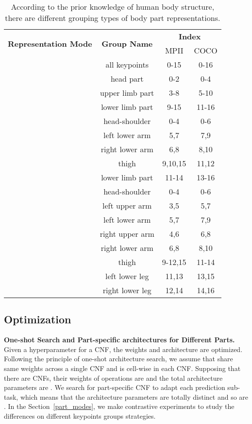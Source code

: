 \documentclass[journal]{IEEEtran}
\begin{document}
\begin{table}[h]
	\centering
	\caption{According to the prior knowledge of human body structure, there are different grouping types of body part representations.}
	\label{group}
	\renewcommand{\arraystretch}{1.1}
	\begin{tabular}{cccc}
		\toprule
		\multirow{2}{*}{\textbf{Representation Mode}}& \multirow{2}{*}{\textbf{Group Name}}&\multicolumn{2}{c}{\textbf{Index}}\\
	
		&&MPII&COCO\\
		\hline
		&all keypoints&0-15&0-16\\
		\hline
		
		\multirow{3}{*}{}& head part& 0-2  & 0-4\\
		
		& upper limb part&3-8 &5-10\\
		& lower limb part&9-15 &11-16\\
		\hline
		\multirow{5}{*}{}& head-shoulder& 0-4&0-6\\
		&left lower arm&5,7&7,9\\
		&right lower arm &6,8&8,10\\
		&thigh&9,10,15&11,12\\
		& lower limb part&11-14 &13-16\\
		\hline
		
		\multirow{8}{*}{}&head-shoulder&0-4&0-6\\
		&left upper arm&3,5&5,7\\
		&left lower arm&5,7&7,9\\
		&right upper arm&4,6&6,8\\
		
		&right lower arm &6,8&8,10\\
		&thigh&9-12,15&11-14\\
		&left lower leg &11,13&13,15\\
		&right lower leg&12,14&14,16\\
		\bottomrule
		
	\end{tabular}
	
	
\end{table}
\subsection{Optimization}
\label{optimization}
\textbf{One-shot Search and Part-specific architectures for Different Parts.} Given a hyperparameter  for a CNF, the weights  and architecture  are optimized. Following the principle of one-shot architecture search\cite{elsken2018neural}, we assume that   share same weights across a single CNF and  is cell-wise in each CNF. Supposing that there are  CNFs, their weights of operations are  and the total architecture parameters are . We search for part-specific CNF to adapt each prediction sub-task, which means that the architecture parameters  are totally distinct and so are . In the Section~\ref{part_modes}, we make contrastive experiments to study the differences on different keypoints groups strategies.
\end{document}

